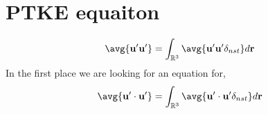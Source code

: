 \section{PTKE equaiton}


\begin{equation}
    \avg{\textbf{u}'\textbf{u}'}
    =
    \int_{\mathbb{R}^3}\avg{\textbf{u}'\textbf{u}'\delta_{nst}} d\textbf{r}
\end{equation}
In the first place we are looking for an equation for,
\begin{equation}
    \avg{\textbf{u}'\cdot \textbf{u}'}
    =
    \int_{\mathbb{R}^3}\avg{\textbf{u}'\cdot \textbf{u}'\delta_{nst}} d\textbf{r}
\end{equation}




